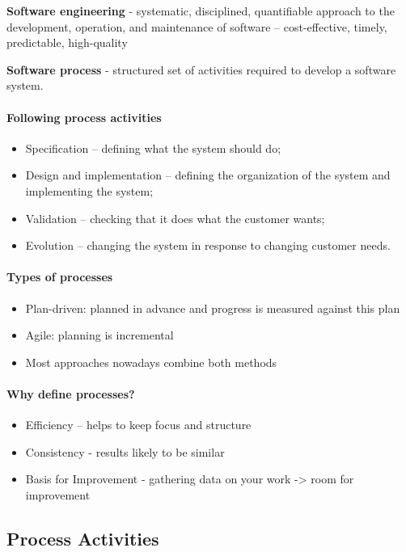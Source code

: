 \documentclass[../ESOF_notes.tex]{subfiles}
\begin{document}
\textbf{Software engineering} - systematic, disciplined, quantifiable approach to the development, operation, and maintenance of software – cost-effective, timely, predictable, high-quality

\textbf{Software process} - structured set of activities required to develop a software system.

\paragraph{Following process activities}
\begin{itemize}
    \item Specification – defining what the system should do;
    \item Design and implementation – defining the organization of the system and implementing the system;
    \item Validation – checking that it does what the customer wants;
    \item Evolution – changing the system in response to changing customer needs.
\end{itemize}

\paragraph{Types of processes}
\begin{itemize}
    \item Plan-driven: planned in advance and progress is measured against this plan
    \item Agile: planning is incremental
    \item Most approaches nowadays combine both methods
\end{itemize}

\paragraph{Why define processes?}
\begin{itemize}
    \item Efficiency – helps to keep focus and structure
    \item Consistency - results likely to be similar
    \item Basis for Improvement - gathering data on your work -> room for improvement
\end{itemize}

\subsection{Process Activities}
\end{document}
